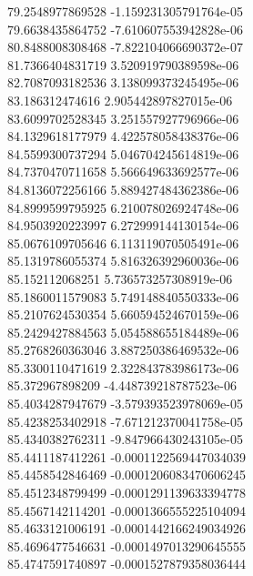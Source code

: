 {79.2548977869528 -1.159231305791764e-05 \\
79.6638435864752 -7.610607553942828e-06 \\
80.8488008308468 -7.822104066690372e-07 \\
81.7366404831719 3.520919790389598e-06 \\
82.7087093182536 3.138099373245495e-06 \\
83.186312474616 2.905442897827015e-06 \\
83.6099702528345 3.251557927796966e-06 \\
84.1329618177979 4.422578058438376e-06 \\
84.5599300737294 5.046704245614819e-06 \\
84.7370470711658 5.566649633692577e-06 \\
84.8136072256166 5.889427484362386e-06 \\
84.8999599795925 6.210078026924748e-06 \\
84.9503920223997 6.272999144130154e-06 \\
85.0676109705646 6.113119070505491e-06 \\
85.1319786055374 5.816326392960036e-06 \\
85.152112068251 5.736573257308919e-06 \\
85.1860011579083 5.749148840550333e-06 \\
85.2107624530354 5.660594524670159e-06 \\
85.2429427884563 5.054588655184489e-06 \\
85.2768260363046 3.887250386469532e-06 \\
85.3300110471619 2.322843783986173e-06 \\
85.372967898209 -4.448739218787523e-06 \\
85.4034287947679 -3.579393523978069e-05 \\
85.4238253402918 -7.671212370041758e-05 \\
85.4340382762311 -9.847966430243105e-05 \\
85.4411187412261 -0.0001122569447034039 \\
85.4458542846469 -0.0001206083470606245 \\
85.4512348799499 -0.0001291139633394778 \\
85.4567142114201 -0.0001366555225104094 \\
85.4633121006191 -0.0001442166249034926 \\
85.4696477546631 -0.0001497013290645555 \\
85.4747591740897 -0.0001527879358036444 \\
}
